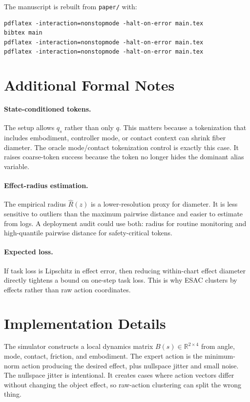 \documentclass{article}
\begin{document}
The manuscript is rebuilt from \texttt{paper/} with:

\begin{verbatim}
pdflatex -interaction=nonstopmode -halt-on-error main.tex
bibtex main
pdflatex -interaction=nonstopmode -halt-on-error main.tex
pdflatex -interaction=nonstopmode -halt-on-error main.tex
\end{verbatim}

\section{Additional Formal Notes}

\paragraph{State-conditioned tokens.}
The setup allows $q_s$ rather than only $q$. This matters because a tokenization
that includes embodiment, controller mode, or contact context can shrink fiber
diameter. The oracle mode/contact tokenization control is exactly this case. It
raises coarse-token success because the token no longer hides the dominant
alias variable.

\paragraph{Effect-radius estimation.}
The empirical radius $\widehat R(z)$ is a lower-resolution proxy for diameter.
It is less sensitive to outliers than the maximum pairwise distance and easier
to estimate from logs. A deployment audit could use both: radius for routine
monitoring and high-quantile pairwise distance for safety-critical tokens.

\paragraph{Expected loss.}
If task loss is Lipschitz in effect error, then reducing within-chart effect
diameter directly tightens a bound on one-step task loss. This is why ESAC
clusters by effects rather than raw action coordinates.

\section{Implementation Details}

The simulator constructs a local dynamics matrix $B(s)\in\mathbb{R}^{2\times4}$
from angle, mode, contact, friction, and embodiment. The expert action is the
minimum-norm action producing the desired effect, plus nullspace jitter and
small noise. The nullspace jitter is intentional. It creates cases where action
vectors differ without changing the object effect, so raw-action clustering can
split the wrong thing.
\end{document}
